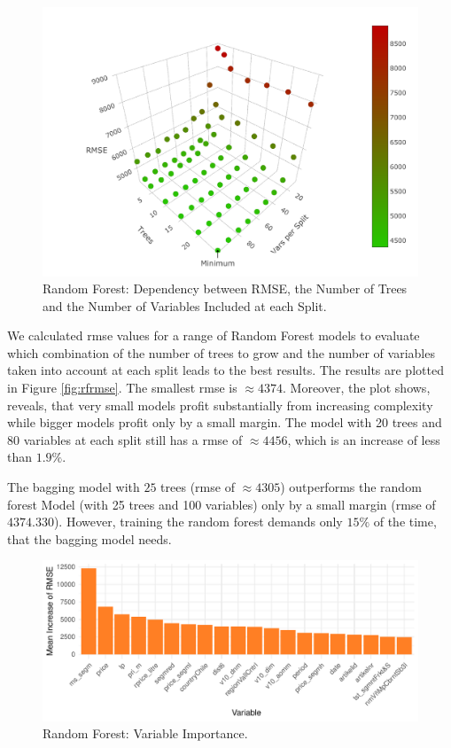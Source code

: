 \documentclass[11pt,]{article}
\begin{document}
\begin{figure}

{\centering \includegraphics{../00_data/output_paper/10_rf_plot} 

}

\caption[RMSE's of the Random Forest for Different Parameters]{\label{fig:rfrmse}Random Forest: Dependency between RMSE, the Number of Trees and the Number of Variables Included at each Split.}\label{fig:unnamed-chunk-10}
\end{figure}

We calculated \ac{rmse} values for a range of Random Forest models to
evaluate which combination of the number of trees to grow and the number
of variables taken into account at each split leads to the best results.
The results are plotted in Figure \ref{fig:rfrmse}. The smallest
\ac{rmse} is \(\approx 4374\). Moreover, the plot shows, reveals, that
very small models profit substantially from increasing complexity while
bigger models profit only by a small margin. The model with 20 trees and
80 variables at each split still has a \ac{rmse} of \(\approx 4456\),
which is an increase of less than \(1.9\%\).

The \ac{bagging} model with \(25\) trees (\ac{rmse} of \(\approx 4305\))
outperforms the random forest Model (with 25 trees and 100 variables)
only by a small margin (\ac{rmse} of \(4374.330\)). However, training
the random forest demands only \(15\%\) of the time, that the
\ac{bagging} model needs.

\begin{figure}
\centering
\includegraphics{../00_data/output_paper/11_var_imp_random_forest_bp.pdf}
\caption{\label{fig:rfimp}Random Forest: Variable Importance.}
\end{figure}
\end{document}

